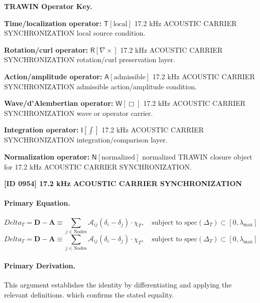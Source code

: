 \par\vspace{0.45\baselineskip}
\noindent\begin{minipage}[t]{\linewidth}
\begingroup
\small
\raggedright
\textbf{TRAWIN Operator Key.}\par
\noindent\textbf{Time/localization operator:} $\mathsf{T}\!\left[\mathrm{local}\right]$ 17.2 kHz ACOUSTIC CARRIER SYNCHRONIZATION local source condition.\par
\noindent\textbf{Rotation/curl operator:} $\mathsf{R}\!\left[\nabla\times\right]$ 17.2 kHz ACOUSTIC CARRIER SYNCHRONIZATION rotation/curl preservation layer.\par
\noindent\textbf{Action/amplitude operator:} $\mathsf{A}\!\left[\mathrm{admissible}\right]$ 17.2 kHz ACOUSTIC CARRIER SYNCHRONIZATION admissible action/amplitude condition.\par
\noindent\textbf{Wave/d'Alembertian operator:} $\mathsf{W}\!\left[\Box\right]$ 17.2 kHz ACOUSTIC CARRIER SYNCHRONIZATION wave or operator carrier.\par
\noindent\textbf{Integration operator:} $\mathsf{I}\!\left[\int\right]$ 17.2 kHz ACOUSTIC CARRIER SYNCHRONIZATION integration/comparison layer.\par
\noindent\textbf{Normalization operator:} $\mathsf{N}\!\left[\mathrm{normalized}\right]$ normalized TRAWIN closure object for 17.2 kHz ACOUSTIC CARRIER SYNCHRONIZATION.\par
\endgroup
\end{minipage}

\clearpage
\noindent\textbf{[ID 0954] 17.2 kHz ACOUSTIC CARRIER SYNCHRONIZATION}\par
\vspace{0.35em}
\paragraph{Primary Equation.}
\[
Delta_T = \mathbf{D} - \mathbf{A} \equiv \sum_{j \in \text{Nodes}} \mathcal{A}_{ij} (\delta_i - \delta_j) \cdot \chi_T, \quad \text{subject to } \text{spec}(\Delta_T) \subset [0, \lambda_{\max}]
\]
\[
Delta_T = \mathbf{D} - \mathbf{A} \equiv \sum_{j \in \text{Nodes}} \mathcal{A}_{ij} (\delta_i - \delta_j) \cdot \chi_T, \quad \text{subject to } \text{spec}(\Delta_T) \subset [0, \lambda_{\max}]
\]

\paragraph{Primary Derivation.}
This argument establishes the identity by differentiating and applying the relevant definitions. which confirms the stated equality.
